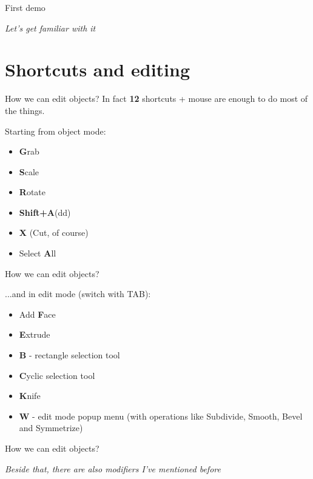 \documentclass{beamer}
\begin{document}
\begin{frame}{First demo}

\centering \Huge
\emph{Let's get familiar with it}

\end{frame}

\section{Shortcuts and editing}

\begin{frame}{How we can edit objects?}
In fact \textbf{12} shortcuts + mouse are enough to do most of the things.

Starting from object mode:
\begin{itemize}
\item \textbf{G}rab
\item \textbf{S}cale
\item \textbf{R}otate
\item \textbf{Shift+A}(dd)
\item \textbf{X} (Cut, of course)
\item Select \textbf{A}ll
\end{itemize}

\end{frame}


\begin{frame}{How we can edit objects?}

...and in edit mode (switch with TAB):
\begin{itemize}
\item Add \textbf{F}ace
\item \textbf{E}xtrude
\item \textbf{B} - rectangle selection tool
\item \textbf{C}yclic selection tool
\item \textbf{K}nife
\item \textbf{W} - edit mode popup menu (with operations like Subdivide, Smooth, Bevel and Symmetrize)

\end{itemize}

\end{frame}

\begin{frame}{How we can edit objects?}

\centering \Large
\emph{Beside that, there are also modifiers I've mentioned before}

\end{frame}
\end{document}
